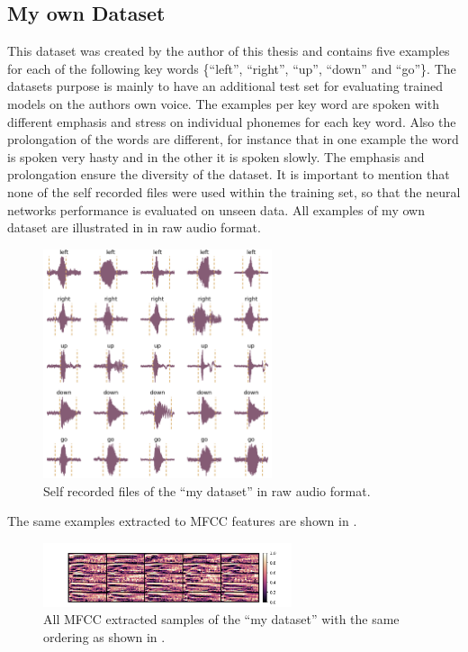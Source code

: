 \FloatBarrier
\noindent



\subsection{My own Dataset}\label{sec:exp_dataset_my}
This dataset was created by the author of this thesis and contains five examples for each of the following key words \{\enquote{left}, \enquote{right}, \enquote{up}, \enquote{down} and \enquote{go}\}.
The datasets purpose is mainly to have an additional test set for evaluating trained models on the authors own voice.
The examples per key word are spoken with different emphasis and stress on individual phonemes for each key word.
Also the prolongation of the words are different, for instance that in one example the word is spoken very hasty and in the other it is spoken slowly.
The emphasis and prolongation ensure the diversity of the dataset.
It is important to mention that none of the self recorded files were used within the training set, so that the neural networks performance is evaluated on unseen data.
All examples of my own dataset are illustrated in  in raw audio format.
\begin{figure}[!ht]
  \centering
    \includegraphics[width=0.6\textwidth]{./5_exp/figs/exp_dataset_my_wav_grid}
  \caption{Self recorded files of the \enquote{my dataset} in raw audio format.}
  \label{fig:exp_dataset_my_wav_grid}
\end{figure}
\FloatBarrier
\noindent
The same examples extracted to MFCC features are shown in .
\begin{figure}[!ht]
  \centering
    \includegraphics[width=0.65\textwidth]{./5_exp/figs/exp_dataset_my_mfcc}
  \caption{All MFCC extracted samples of the \enquote{my dataset} with the same ordering as shown in .}
  \label{fig:exp_dataset_my_mfcc}
\end{figure}
